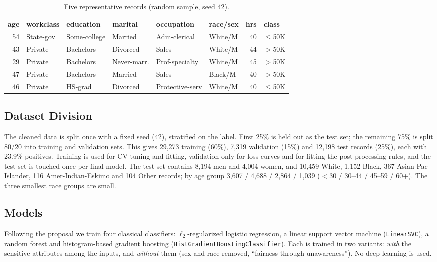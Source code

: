 \documentclass[conference]{IEEEtran}
\begin{document}
\begin{table}[t]
\caption{Five representative records (random sample, seed 42).}
\label{tab:sample}
\centering\scriptsize
\setlength{\tabcolsep}{3pt}
\begin{tabular}{rlllllrl}
\toprule
age & workclass & education & marital & occupation & race/sex & hrs & class \\
\midrule
54 & State-gov & Some-college & Married & Adm-clerical & White/M & 40 & $\leq$50K \\
43 & Private & Bachelors & Divorced & Sales & White/M & 44 & $>$50K \\
29 & Private & Bachelors & Never-marr. & Prof-specialty & White/M & 45 & $>$50K \\
47 & Private & Bachelors & Married & Sales & Black/M & 40 & $>$50K \\
46 & Private & HS-grad & Divorced & Protective-serv & White/M & 40 & $\leq$50K \\
\bottomrule
\end{tabular}
\end{table}

\subsection{Dataset Division}
The cleaned data is split once with a fixed seed (42), stratified on the label. First 25\% is held out as the test set; the remaining 75\% is split 80/20 into training and validation sets. This gives 29{,}273 training (60\%), 7{,}319 validation (15\%) and 12{,}198 test records (25\%), each with 23.9\% positives. Training is used for CV tuning and fitting, validation only for loss curves and for fitting the post-processing rules, and the test set is touched once per final model. The test set contains 8{,}194 men and 4{,}004 women, and 10{,}459 White, 1{,}152 Black, 367 Asian-Pac-Islander, 116 Amer-Indian-Eskimo and 104 Other records; by age group 3{,}607 / 4{,}688 / 2{,}864 / 1{,}039 ($<$30 / 30--44 / 45--59 / 60+). The three smallest race groups are small.

\subsection{Models}
Following the proposal we train four classical classifiers: $\ell_2$-regularized logistic regression, a linear support vector machine (\texttt{LinearSVC}), a random forest and histogram-based gradient boosting (\texttt{HistGradientBoostingClassifier}). Each is trained in two variants: \emph{with} the sensitive attributes among the inputs, and \emph{without} them (sex and race removed, ``fairness through unawareness''). No deep learning is used.
\end{document}
